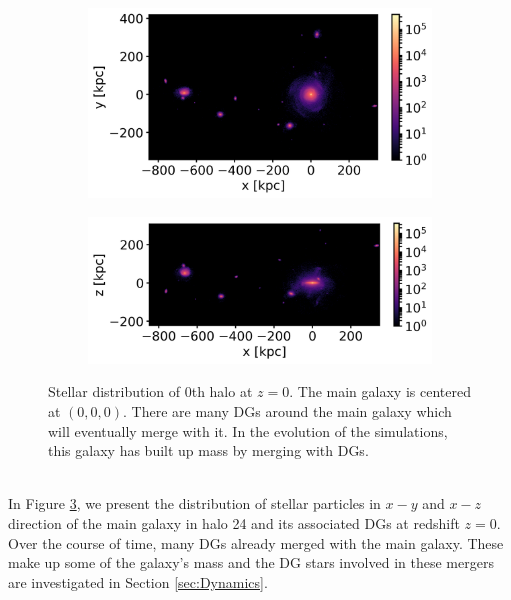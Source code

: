\begin{figure}[htbp]
\captionsetup{format=plain}
    \centering
    \begin{subfigure}[b]{0.8\textwidth}
	    \includegraphics[width=\textwidth]{plots/Auriga/Au24_stars_xy_distribution_halo0.png}
	    \label{fig:Au24_stars_xy}
    \end{subfigure}
    
    \begin{subfigure}[b]{0.8\textwidth}
    \centering
    	\includegraphics[width=\textwidth]{plots/Auriga/Au24_stars_xz_distribution_halo0.png}
    	\label{fig:Au24_stars_xz}
    \end{subfigure}
    \caption{Stellar distribution of 0th halo at $\textit{z}=0$. The main galaxy is centered at $(0,0,0)$. There are many \acp{DG} around the main galaxy which will eventually merge with it. In the evolution of the simulations, this galaxy has built up mass by merging with \acp{DG}. }\label{fig:Stars_AU24}
\end{figure}
\\In Figure \ref{fig:Stars_AU24}, we present the distribution of stellar particles in $x-y$ and $x-z$ direction of the main galaxy in halo 24 and its associated \acp{DG} at redshift $z=0$. Over the course of time, many \acp{DG} already merged with the main galaxy. These make up some of the galaxy's mass and the \ac{DG} stars involved in these mergers are investigated in Section \ref{sec:Dynamics}.\\
